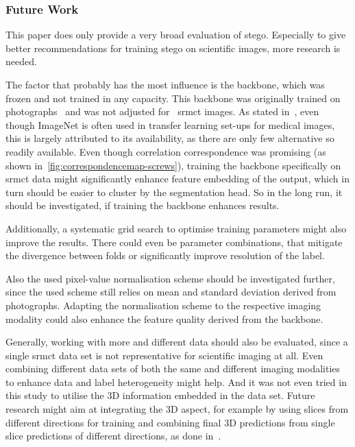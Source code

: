 \subsubsection{Future Work}
This paper does only provide a very broad evaluation of \gls{stego}.
Especially to give better recommendations for training \gls{stego} on scientific images, more research is needed.

The factor that probably has the most influence is the backbone, which was frozen and not trained in any capacity.
This backbone was originally trained on photographs~\autocite{Hamilton2022,Caron2021} and was not adjusted for ~\gls{srmct} images.
As stated in~\autocite{Cheplygina2019}, even though ImageNet is often used in transfer learning set-ups for medical images, this is largely attributed to its availability, as there are only few alternative so readily available.
Even though correlation correspondence was promising (as shown in~\autoref{fig:correspondencemap-screws}), training the backbone specifically on \gls{srmct} data might significantly enhance feature embedding of the output, which in turn should be easier to cluster by the segmentation head.
So in the long run, it should be investigated, if training the backbone enhances results.

Additionally, a systematic grid search to optimise training parameters might also improve the results.
There could even be parameter combinations, that mitigate the divergence between folds or significantly improve resolution of the  label.

Also the used pixel-value normalisation scheme should be investigated further, since the used scheme still relies on mean and standard deviation derived from photographs.
Adapting the normalisation scheme to the respective imaging modality could also enhance the feature quality derived from the backbone.

Generally, working with more and different data should also be evaluated, since a single \gls{srmct} data set is not representative for scientific imaging at all.
Even combining different data sets of both the same and different imaging modalities to enhance data and label heterogeneity might help.
And it was not even tried in this study to utilise the 3D information embedded in the data set.
Future research might aim at integrating the 3D aspect, for example by using slices from different directions for training and combining final 3D predictions from single slice predictions of different directions, as done in~\autocite{Zhou2017}.

